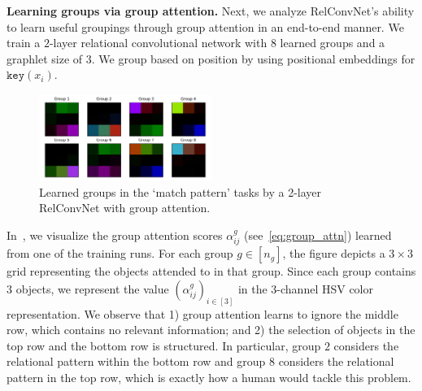 \textbf{Learning groups via group attention.} Next, we analyze RelConvNet's ability to learn useful groupings through group attention in an end-to-end manner. We train a $2$-layer relational convolutional network with $8$ learned groups and a graphlet size of $3$. We group based on position by using positional embeddings for $\mathtt{key}(x_i)$.
\begin{figure}
    \centering
    \vskip-10pt
    \includegraphics[width=0.5\textwidth]{figs/group_attn_figs/match_patt_group_attn_map.pdf}
    \caption{Learned groups in the `match pattern' tasks by a 2-layer RelConvNet with group attention.}\label{fig:matchpatt_groupattn}
\end{figure}
In~, we visualize the group attention scores $\alpha_{ij}^g$ (see~\cref{eq:group_attn}) learned from one of the training runs. For each group $g \in [n_g]$, the figure depicts a $3 \times 3$ grid representing the objects attended to in that group. Since each group contains $3$ objects, we represent the value $(\alpha_{ij}^g)_{i \in [3]}$ in the $3$-channel HSV color representation. We observe that 1) group attention learns to ignore the middle row, which contains no relevant information; and 2) the selection of objects in the top row and the bottom row is structured. In particular, group $2$ considers the relational pattern within the bottom row and group $8$ considers the relational pattern in the top row, which is exactly how a human would tackle this problem.
